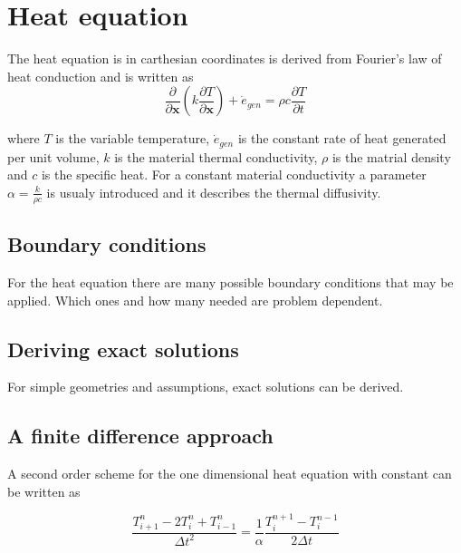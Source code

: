 \documentclass[11pt]{report}
\begin{document}
\chapter*{Heat equation}

The heat equation is in carthesian coordinates is derived from Fourier's law of heat conduction and 
is written as
\begin{equation}
\frac{\partial}{\partial\mathbf{x}}\left(k\frac{\partial T}{\partial \mathbf{x}} \right) + \dot{e}_{gen} = \rho c\frac{\partial T}{\partial t}
\end{equation}

where $T$ is the variable temperature, $\dot{e}_{gen}$ is the constant rate of heat generated per unit volume,
 $k$ is the material thermal conductivity, $\rho$ is the matrial density and $c$ is the specific heat.
For a constant material conductivity a parameter $\alpha = \frac{k}{\rho c}$ is usualy introduced and it describes
the thermal diffusivity.


\section*{Boundary conditions}

For the heat equation there are many possible boundary conditions
that may be applied. Which ones and how many needed are problem dependent.





\section*{Deriving exact solutions}

For simple geometries and assumptions, exact solutions can be derived.



\section*{A finite difference approach}

A second order scheme for the one dimensional heat equation with constant
can be written as

\begin{equation}
\frac{T_{i+1}^n-2T_i^n+T_{i-1}^n}{\Delta t^2} = \frac{1}{\alpha}\frac{T_i^{n+1}-T_i^{n-1}}{2\Delta t}
\end{equation}
\end{document}
